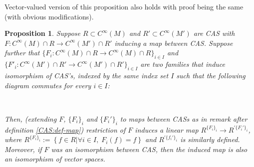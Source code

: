 \documentclass{article}
\newcommand{\assign}{:=}
\newtheorem{proposition}{Proposition}
{\theorembodyfont{\rmfamily}\newtheorem{remark}{Remark}}
\begin{document}
\begin{remark}
  Vector-valued version of this proposition also holds with proof being the
  same (with obvious modifications).
\end{remark}

\begin{proposition}
  \label{CAS:prop-invariant}Suppose $R \subset C^{\infty} (M)$ and $R' \subset
  C^{\infty} (M')$ are CAS with $F : C^{\infty} (M) \cap R \rightarrow
  C^{\infty} (M') \cap R'$ inducing a map between CAS. Suppose further that
  $\{ F_i : C^{\infty} (M) \cap R \rightarrow C^{\infty} (M) \cap R \}_{i \in
  I}$ and $\{ F'_i : C^{\infty} (M') \cap R' \rightarrow C^{\infty} (M') \cap
  R' \}_{i \in I}$ are two families that induce isomorphism of CAS's, indexed
  by the same index set $I$ such that the following diagram commutes for every
  $i \in I$:
  \begin{center}
    
    \ 
  \end{center}
  Then, (extending $F$, $\{ F_i \}_i$ and $\{ F_i' \}_i$ to maps between CASs
  as in remark after definition \ref{CAS:def-map}) restriction of $F$ induces
  a linear map $R^{\{ F_i \}_i} \rightarrow R^{\prime\{ F_i' \}_i}$, where
  $R^{\{ F_i \}_i} \assign \left\{ f \in R \big| \forall i \in I, \; F_i
  (f) = f \right\}$ and $R^{\prime\{ f_i' \}_i}$ is similarly defined.
  Moreover, if $F$ was an isomorphism between CAS, then the induced map is
  also an isomorphism of vector spaces.
\end{proposition}
\end{document}
